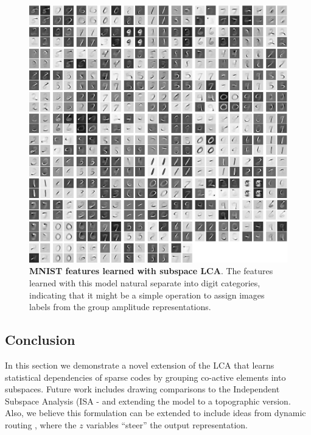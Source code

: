 \begin{figure}\label{fig:ch3_subspace_lca_mnist_features}
    \centering
    \includegraphics[width=\textwidth]{figures/subspace_lca_mnist_features.png}
    \caption{\textbf{MNIST features learned with subspace LCA}. The features learned with this model natural separate into digit categories, indicating that it might be a simple operation to assign images labels from the group amplitude representations.}
\end{figure}

\subsection{Conclusion}
In this section we demonstrate a novel extension of the LCA that learns statistical dependencies of sparse codes by grouping co-active elements into subspaces. Future work includes drawing comparisons to the Independent Subspace Analysis (ISA - \cite{hyvarinen2000emergence} and extending the model to a topographic version. Also, we believe this formulation can be extended to include ideas from dynamic routing \parencite{olshausen1993neurobiological}, where the $z$ variables ``steer'' the output representation.